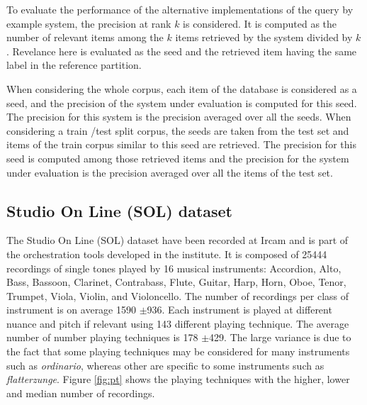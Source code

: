\documentclass{article}
\begin{document}
To evaluate the performance of the alternative implementations of the query by example system, the precision at rank $k$ is considered. It is computed as the number of relevant items among the $k$ items retrieved by the system divided by $k$. Revelance here is evaluated as the seed and the retrieved item having the same label in the reference partition.

When considering the whole corpus, each item of the database is considered as a seed, and the precision of the system under evaluation is computed for this seed. The precision for this system is the precision averaged over all the seeds. When considering a train /test split corpus, the seeds are taken from the test set and  items of the train corpus similar to this seed are retrieved. The precision for this seed is computed among those retrieved items and the precision for the system under evaluation is the precision averaged over all the items of the test set.

\subsection{Studio On Line (SOL) dataset}


The Studio On Line (SOL) dataset have been recorded at Ircam and is part of the orchestration tools developed in the institute. It is composed of 25444 recordings of single tones played by 16 musical instruments: Accordion, Alto, Bass, Bassoon, Clarinet, Contrabass, Flute, Guitar, Harp, Horn, Oboe, Tenor, Trumpet, Viola, Violin, and Violoncello. The number of recordings per class of instrument is on average 1590 $\pm$936.  Each instrument is played at different nuance and pitch if relevant using 143 different playing technique. The average number of number playing techniques is 178 $\pm$429. The large variance is due to the fact that some playing techniques may be considered for many instruments such as \textit{ordinario}, whereas other are specific to some instruments such as \textit{flatterzunge}. Figure \ref{fig:pt} shows the playing techniques with the higher, lower and median number of recordings.

\end{document}
